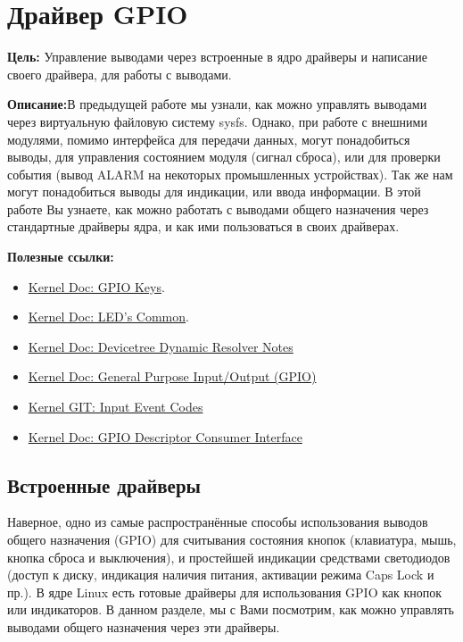 \chapter{Драйвер GPIO}
\textbf{Цель:} Управление выводами через встроенные в ядро драйверы и написание своего драйвера, для работы с выводами.

\vspace{5mm}
\textbf{Описание:}В предыдущей работе мы узнали, как можно управлять выводами через виртуальную файловую систему sysfs. Однако, при работе с внешними модулями, помимо интерфейса для передачи данных, могут понадобиться выводы, для управления состоянием модуля (сигнал сброса), или для проверки события (вывод ALARM на некоторых промышленных устройствах). Так же нам могут понадобиться выводы для индикации, или ввода информации. В этой работе Вы узнаете, как можно работать с выводами общего назначения через стандартные драйверы ядра, и как ими пользоваться в своих драйверах. 

\vspace{5mm}
\textbf{Полезные ссылки:}
\begin{itemize}
	\item \href{https://www.kernel.org/doc/Documentation/devicetree/bindings/input/gpio-keys.txt}{Kernel Doc: GPIO Keys}.
	\item \href{https://www.kernel.org/doc/Documentation/devicetree/bindings/leds/common.yaml}{Kernel Doc: LED's Common}.
	\item \href{https://docs.kernel.org/devicetree/dynamic-resolution-notes.html}{Kernel Doc: Devicetree Dynamic Resolver Notes}
	\item \href{https://www.kernel.org/doc/html/v4.15/driver-api/gpio.html}{Kernel Doc: General Purpose Input/Output (GPIO)}
	\item \href{https://git.kernel.org/pub/scm/linux/kernel/git/torvalds/linux.git/tree/include/uapi/linux/input-event-codes.h}{Kernel GIT: Input Event Codes}
	\item \href{https://www.kernel.org/doc/Documentation/gpio/consumer.txt}{Kernel Doc: GPIO Descriptor Consumer Interface}	
\end{itemize}

\section{Встроенные драйверы}
Наверное, одно из самые распространённые способы использования выводов общего назначения (GPIO) для считывания состояния кнопок (клавиатура, мышь, кнопка сброса и выключения), и простейшей индикации средствами светодиодов (доступ к диску,  индикация наличия питания, активации режима Caps Lock и пр.). В ядре Linux есть готовые драйверы для использования GPIO как кнопок или индикаторов. В данном разделе, мы с Вами посмотрим, как можно управлять выводами общего назначения через эти драйверы.

